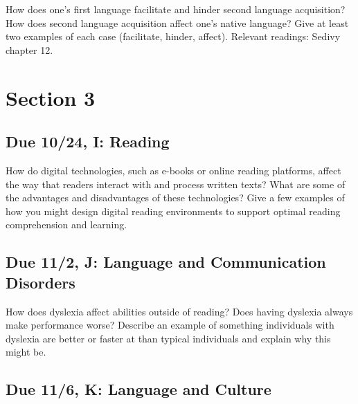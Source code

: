 \documentclass[
  letterpaper,
  DIV=11,
  numbers=noendperiod]{scrreprt}
\begin{document}
How does one's first language facilitate and hinder second language
acquisition? How does second language acquisition affect one's native
language? Give at least two examples of each case (facilitate, hinder,
affect). Relevant readings: Sedivy chapter 12.

\hypertarget{section-3}{%
\section*{\texorpdfstring{{Section 3}}{Section 3}}\label{section-3}}


\hypertarget{due-1024-i-reading}{%
\subsection*{Due 10/24, I: Reading}\label{due-1024-i-reading}}

How do digital technologies, such as e-books or online reading
platforms, affect the way that readers interact with and process written
texts? What are some of the advantages and disadvantages of these
technologies? Give a few examples of how you might design digital
reading environments to support optimal reading comprehension and
learning.

\hypertarget{due-112-j-language-and-communication-disorders}{%
\subsection*{Due 11/2, J: Language and Communication
Disorders}\label{due-112-j-language-and-communication-disorders}}

How does dyslexia affect abilities outside of reading? Does having
dyslexia always make performance worse? Describe an example of something
individuals with dyslexia are better or faster at than typical
individuals and explain why this might be.

\hypertarget{due-116-k-language-and-culture}{%
\subsection*{Due 11/6, K: Language and
Culture}\label{due-116-k-language-and-culture}}
\end{document}
